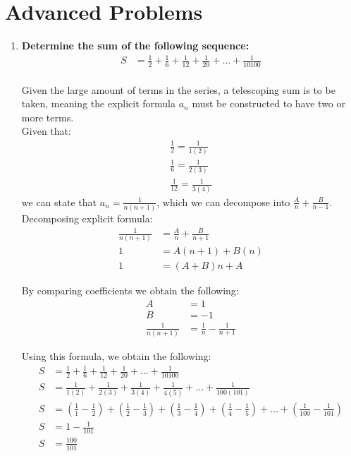 \documentclass[12pt]{article}
\begin{document}
\section*{Advanced Problems}
\begin{enumerate}
    \item \textbf{Determine the sum of the following sequence:
    \begin{align*}
        S & = \frac{1}{2} + \frac{1}{6} + \frac{1}{12} + \frac{1}{20} + \dots + \frac{1}{10100}
    \end{align*}} \\
    
    Given the large amount of terms in the series, a telescoping sum is to be taken, meaning the explicit formula $a_n$ must be constructed to have two or more terms. \\
    
    Given that:
    \begin{align*}
        \frac{1}{2} = \frac{1}{1(2)} \\
        \frac{1}{6} = \frac{1}{2(3)} \\
        \frac{1}{12} = \frac{1}{3(4)}
    \end{align*}
    we can state that $a_n = \frac{1}{n(n+1)}$, which we can decompose into $\frac{A}{n} + \frac{B}{n - 1}$. \\
    
    Decomposing explicit formula:
    \begin{align*}
        \frac{1}{n(n+1)} & = \frac{A}{n} + \frac{B}{n + 1}\\
        1 & = A(n+1)+B(n) \\
        1 & = (A + B)n + A
    \end{align*}
    
    By comparing coefficients we obtain the following:
    \begin{align*}
        A & = 1 \\ 
        B & = -1 \\
        \frac{1}{n(n+1)} & = \frac{1}{n} - \frac{1}{n + 1}
    \end{align*}
    
    Using this formula, we obtain the following:
    \begin{align*}
        S & = \frac{1}{2} + \frac{1}{6} + \frac{1}{12} + \frac{1}{20} + \dots + \frac{1}{10100} \\
        S & = \frac{1}{1(2)} + \frac{1}{2(3)} + \frac{1}{3(4)} + \frac{1}{4(5)} + \dots + \frac{1}{100(101)} \\
        S & = (\frac{1}{1} - \frac{1}{2}) +  (\frac{1}{2} - \frac{1}{3}) +  (\frac{1}{3} - \frac{1}{4}) +  (\frac{1}{4} - \frac{1}{5}) + \dots + (\frac{1}{100} - \frac{1}{101})\\
        S & = 1 - \frac{1}{101} \\
        S & = \frac{100}{101}
    \end{align*}
    

\end{enumerate}
\end{document}
